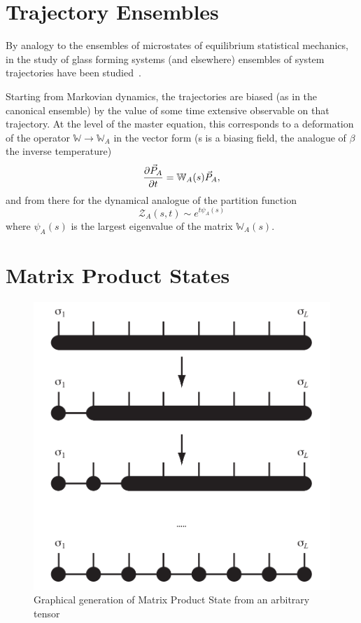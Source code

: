 \documentclass[final]{beamer}
\begin{document}
\begin{frame}[t]
\begin{multicols}{3}
\section{Trajectory Ensembles}

By analogy to the ensembles of microstates of equilibrium statistical mechanics, in the study of glass forming systems (and elsewhere) ensembles of system trajectories have been studied~\cite{Garrahan2009}.

Starting from Markovian dynamics, the trajectories are biased (as in the canonical ensemble) by the value of some time extensive observable on that trajectory.
At the level of the master equation, this corresponds to a deformation of the operator $\mathbb{W} \rightarrow \mathbb{W}_A$ in the vector form (s is a biasing field, the analogue of $\beta$ the inverse temperature)
\begin{equation}
    \pdv{\vec{P}_A}{t} = \mathbb{W}_A(s) \vec{P}_A,
\end{equation}
and from there for the dynamical analogue of the partition function
\begin{equation}
    \mathcal{Z}_A(s, t) \sim e^{t \psi_A(s)}
\end{equation}
where $\psi_A(s)$ is the largest eigenvalue of the matrix $\mathbb{W}_A(s)$.

\section{Matrix Product States}

\begin{figure}[h]
\includegraphics[width=\linewidth]{mps_gen}
\caption{Graphical generation of Matrix Product State from an arbitrary tensor\cite{Schollwock2011}\cite{Orus2014}}
\end{figure}


\end{multicols}
\end{frame}
\end{document}
